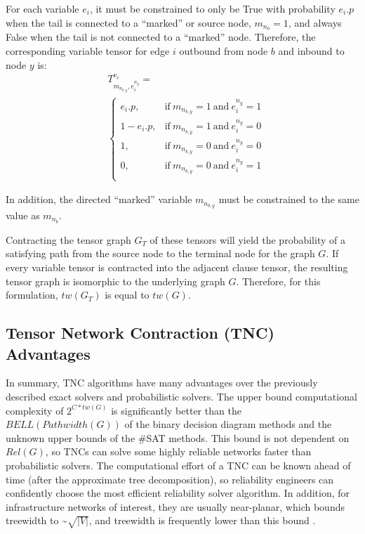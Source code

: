 For each variable \(e_i\), it must be constrained to only be True with probability \(e_i.p\) when the tail is connected to a ``marked'' or source node, \(m_{n_b}=1\), and always False when the tail is not connected to a ``marked'' node. Therefore, the corresponding variable tensor for edge \(i\) outbound from node \(b\) and inbound to node \(y\) is: \begin{equation*}
\begin{split}
& T^{v_e}_{m_{n_{b,y}},e_i^{n_y}}= \\
& \begin{cases}
  e_i.p, & \text{if}\ m_{n_{b,y}}=1\ \text{and}\ e_i^{n_y}=1 \\
  1-e_i.p, & \text{if}\ m_{n_{b,y}}=1\ \text{and}\ e_i^{n_y}=0 \\
  1, & \text{if}\ m_{n_{b,y}}=0\ \text{and}\ e_i^{n_y}=0 \\
  0, & \text{if}\ m_{n_{b,y}}=0\ \text{and}\ e_i^{n_y}=1 \\
\end{cases}
\end{split}
\end{equation*}

In addition, the directed ``marked'' variable \(m_{n_{b,y}}\) must be constrained to the same value as \(m_{n_b}\).

Contracting the tensor graph \(G_T\) of these tensors will yield the probability of a satisfying path from the source node to the terminal node for the graph \(G\). If every variable tensor is contracted into the adjacent clause tensor, the resulting tensor graph is isomorphic to the underlying graph \(G\). Therefore, for this formulation, \(tw(G_T)\) is equal to \(tw(G)\).

\hypertarget{tensor-network-contraction-tnc-advantages}{%
\subsection{Tensor Network Contraction (TNC) Advantages}\label{tensor-network-contraction-tnc-advantages}}

In summary, TNC algorithms have many advantages over the previously described exact solvers and probabilistic solvers. The upper bound computational complexity of \(2^{C*tw(G)}\) is significantly better than the \(BELL(Pathwidth(G))\) of the binary decision diagram methods and the unknown upper bounds of the \#SAT methods. This bound is not dependent on \(Rel(G)\), so TNCs can solve some highly reliable networks faster than probabilistic solvers. The computational effort of a TNC can be known ahead of time (after the approximate tree decomposition), so reliability engineers can confidently choose the most efficient reliability solver algorithm. In addition, for infrastructure networks of interest, they are usually near-planar, which bounds treewidth to \textasciitilde{}\(\sqrt{|V|}\), and treewidth is frequently lower than this bound \cite{maniu2019experimental}.

